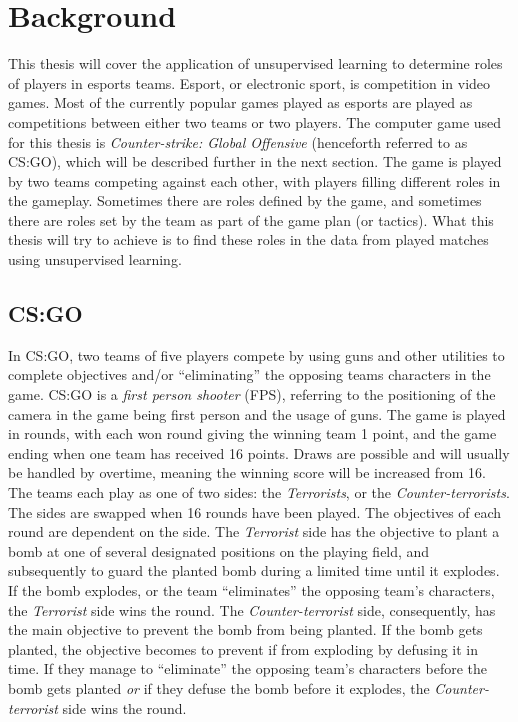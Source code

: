 \section{Background}
This thesis will cover the application of unsupervised learning to determine roles of players in esports teams. Esport, or electronic sport, is competition in video games. Most of the currently popular games played as esports are played as competitions between either two teams or two players. The computer game used for this thesis is {\it Counter-strike: Global Offensive} (henceforth referred to as CS:GO), which will be described further in the next section. The game is played by two teams competing against each other, with players filling different roles in the gameplay. Sometimes there are roles defined by the game, and sometimes there are roles set by the team as part of the game plan (or tactics). What this thesis will try to achieve is to find these roles in the data from played matches using unsupervised learning.

\subsection{CS:GO}
In CS:GO, two teams of five players compete by using guns and other utilities to complete objectives and/or ``eliminating'' the opposing teams characters in the game. CS:GO is a {\it first person shooter} (FPS), referring to the positioning of the camera in the game being first person and the usage of guns. The game is played in rounds, with each won round giving the winning team 1 point, and the game ending when one team has received 16 points. Draws are possible and will usually be handled by overtime, meaning the winning score will be increased from 16. The teams each play as one of two sides: the {\it Terrorists}, or the {\it Counter-terrorists}. The sides are swapped when 16 rounds have been played. The objectives of each round are dependent on the side. The {\it Terrorist} side has the objective to plant a bomb at one of several designated positions on the playing field, and subsequently to guard the planted bomb during a limited time until it explodes. If the bomb explodes, or the team ``eliminates'' the opposing team's characters, the {\it Terrorist} side wins the round. The {\it Counter-terrorist} side, consequently, has the main objective to prevent the bomb from being planted. If the bomb gets planted, the objective becomes to prevent if from exploding by defusing it in time. If they manage to ``eliminate'' the opposing team's characters before the bomb gets planted {\it or} if they defuse the bomb before it explodes, the {\it Counter-terrorist} side wins the round.

